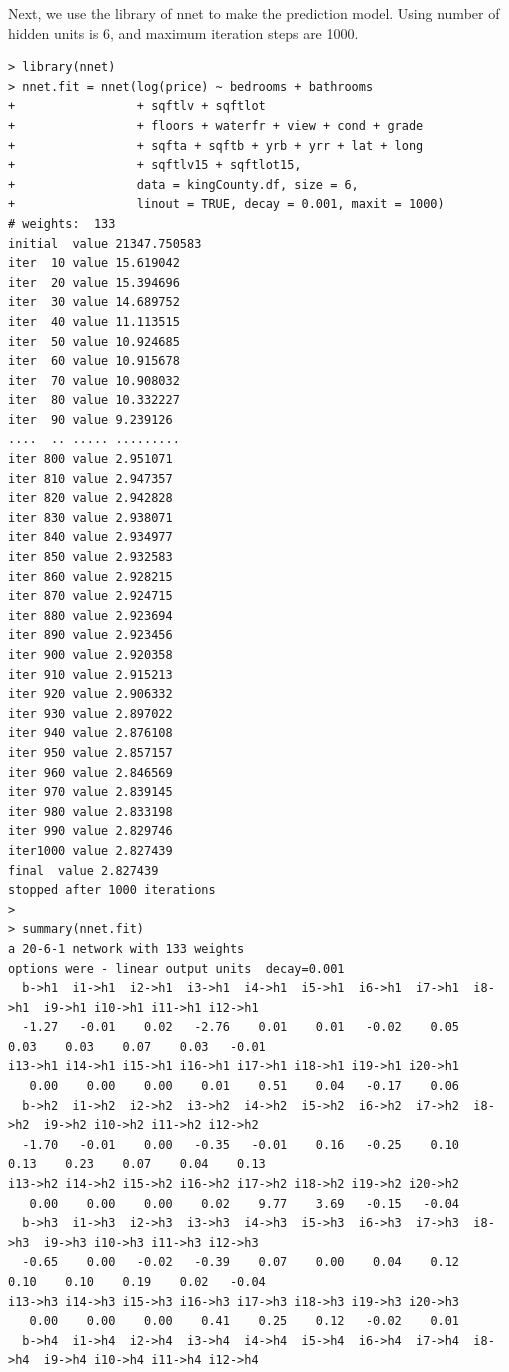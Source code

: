 \documentclass{article}%
\begin{document}
\indent Next, we use the library of nnet to make the prediction model. Using number of hidden units is 6, and maximum iteration steps are 1000.
\begin{verbatim}
> library(nnet)
> nnet.fit = nnet(log(price) ~ bedrooms + bathrooms
+                 + sqftlv + sqftlot
+                 + floors + waterfr + view + cond + grade
+                 + sqfta + sqftb + yrb + yrr + lat + long
+                 + sqftlv15 + sqftlot15,
+                 data = kingCounty.df, size = 6,
+                 linout = TRUE, decay = 0.001, maxit = 1000)
# weights:  133
initial  value 21347.750583
iter  10 value 15.619042
iter  20 value 15.394696
iter  30 value 14.689752
iter  40 value 11.113515
iter  50 value 10.924685
iter  60 value 10.915678
iter  70 value 10.908032
iter  80 value 10.332227
iter  90 value 9.239126
....  .. ..... .........
iter 800 value 2.951071
iter 810 value 2.947357
iter 820 value 2.942828
iter 830 value 2.938071
iter 840 value 2.934977
iter 850 value 2.932583
iter 860 value 2.928215
iter 870 value 2.924715
iter 880 value 2.923694
iter 890 value 2.923456
iter 900 value 2.920358
iter 910 value 2.915213
iter 920 value 2.906332
iter 930 value 2.897022
iter 940 value 2.876108
iter 950 value 2.857157
iter 960 value 2.846569
iter 970 value 2.839145
iter 980 value 2.833198
iter 990 value 2.829746
iter1000 value 2.827439
final  value 2.827439
stopped after 1000 iterations
>
> summary(nnet.fit)
a 20-6-1 network with 133 weights
options were - linear output units  decay=0.001
  b->h1  i1->h1  i2->h1  i3->h1  i4->h1  i5->h1  i6->h1  i7->h1  i8->h1  i9->h1 i10->h1 i11->h1 i12->h1
  -1.27   -0.01    0.02   -2.76    0.01    0.01   -0.02    0.05    0.03    0.03    0.07    0.03   -0.01
i13->h1 i14->h1 i15->h1 i16->h1 i17->h1 i18->h1 i19->h1 i20->h1
   0.00    0.00    0.00    0.01    0.51    0.04   -0.17    0.06
  b->h2  i1->h2  i2->h2  i3->h2  i4->h2  i5->h2  i6->h2  i7->h2  i8->h2  i9->h2 i10->h2 i11->h2 i12->h2
  -1.70   -0.01    0.00   -0.35   -0.01    0.16   -0.25    0.10    0.13    0.23    0.07    0.04    0.13
i13->h2 i14->h2 i15->h2 i16->h2 i17->h2 i18->h2 i19->h2 i20->h2
   0.00    0.00    0.00    0.02    9.77    3.69   -0.15   -0.04
  b->h3  i1->h3  i2->h3  i3->h3  i4->h3  i5->h3  i6->h3  i7->h3  i8->h3  i9->h3 i10->h3 i11->h3 i12->h3
  -0.65    0.00   -0.02   -0.39    0.07    0.00    0.04    0.12    0.10    0.10    0.19    0.02   -0.04
i13->h3 i14->h3 i15->h3 i16->h3 i17->h3 i18->h3 i19->h3 i20->h3
   0.00    0.00    0.00    0.41    0.25    0.12   -0.02    0.01
  b->h4  i1->h4  i2->h4  i3->h4  i4->h4  i5->h4  i6->h4  i7->h4  i8->h4  i9->h4 i10->h4 i11->h4 i12->h4

\end{verbatim}
\end{document}
